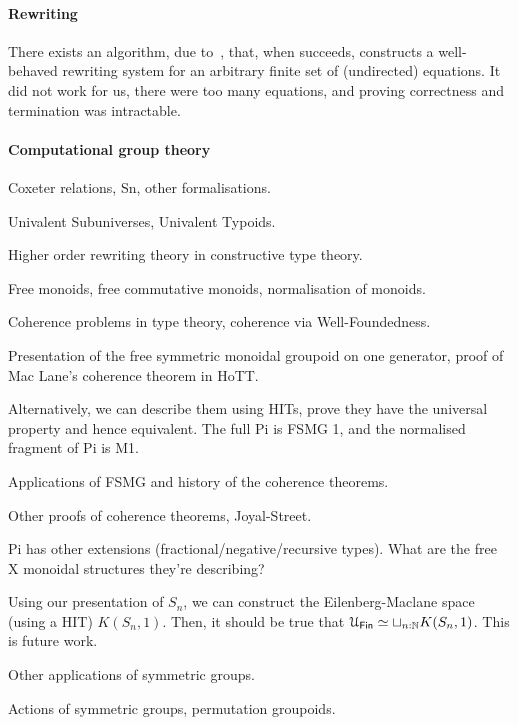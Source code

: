 \paragraph{Rewriting} There exists an algorithm, due to~\citet{knuthSimpleWordProblems1970}, that, when succeeds,
constructs a well-behaved rewriting system for an arbitrary finite set of (undirected) equations. It did not work for
us, there were too many equations, and proving correctness and termination was intractable.

\paragraph{Computational group theory} Coxeter relations, Sn, other formalisations.

Univalent Subuniverses, Univalent Typoids.

Higher order rewriting theory in constructive type theory.

Free monoids, free commutative monoids, normalisation of monoids.

Coherence problems in type theory, coherence via Well-Foundedness.

Presentation of the free symmetric monoidal groupoid on one generator, proof of Mac Lane's coherence theorem in HoTT.

Alternatively, we can describe them using HITs, prove they have the universal property and hence equivalent.
The full Pi is FSMG 1, and the normalised fragment of Pi is M1.

Applications of FSMG and history of the coherence theorems.

Other proofs of coherence theorems, Joyal-Street.

Pi has other extensions (fractional/negative/recursive types).
What are the free X monoidal structures they're describing?

Using our presentation of $S_{n}$, we can construct the Eilenberg-Maclane space (using a HIT) $K(S_{n},1)$. Then, it
should be true that $\UFin \eqv \sqcup_{n:\Nat} K(S_{n},1)$. This is future work.

Other applications of symmetric groups.

Actions of symmetric groups, permutation groupoids.

